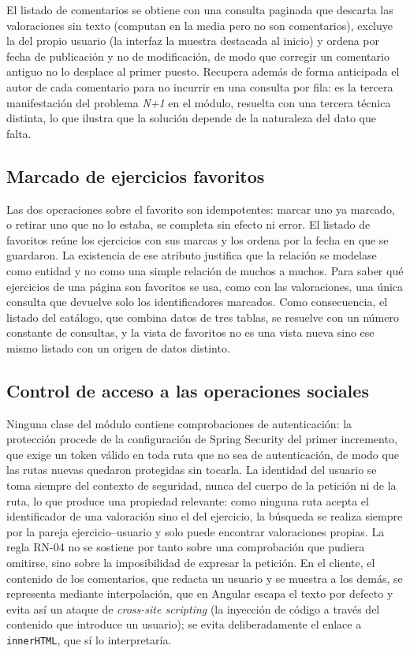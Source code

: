 \documentclass[12pt,a4paper,twoside,openright]{book}
\begin{document}
    El listado de comentarios se obtiene con una consulta paginada que descarta
    las valoraciones sin texto (computan en la media pero no son comentarios),
    excluye la del propio usuario (la interfaz la muestra destacada al inicio)
    y ordena por fecha de publicación y no de modificación, de modo que corregir
    un comentario antiguo no lo desplace al primer puesto. Recupera además de
    forma anticipada el autor de cada comentario para no incurrir en una consulta
    por fila: es la tercera manifestación del problema \textit{N+1} en el módulo,
    resuelta con una tercera técnica distinta, lo que ilustra que la solución
    depende de la naturaleza del dato que falta.

    \subsection{Marcado de ejercicios favoritos}

    Las dos operaciones sobre el favorito son idempotentes: marcar uno ya marcado,
    o retirar uno que no lo estaba, se completa sin efecto ni error. El listado de
    favoritos reúne los ejercicios con sus marcas y los ordena por la fecha 
    en que se guardaron. La existencia de ese atributo justifica que la relación
    se modelase como entidad y no como una simple relación de muchos a muchos. Para saber
    qué ejercicios de una página son favoritos se usa, como con las valoraciones,
    una única consulta que devuelve solo los identificadores marcados. Como
    consecuencia, el listado del catálogo, que combina datos de tres tablas, se
    resuelve con un número constante de consultas, y la vista de favoritos no es
    una vista nueva sino ese mismo listado con un origen de datos distinto.

    \subsection{Control de acceso a las operaciones sociales}

    Ninguna clase del módulo contiene comprobaciones de autenticación: la
    protección procede de la configuración de Spring Security del primer
    incremento, que exige un token válido en toda ruta que no sea de
    autenticación, de modo que las rutas nuevas quedaron protegidas sin tocarla.
    La identidad del usuario se toma siempre del contexto de seguridad,
    nunca del cuerpo de la petición ni de la ruta, lo que produce una propiedad relevante:
    como ninguna ruta acepta el identificador de una valoración sino el
    del ejercicio, la búsqueda se realiza siempre por la pareja ejercicio--usuario
    y solo puede encontrar valoraciones propias. La regla RN-04 no se sostiene por
    tanto sobre una comprobación que pudiera omitirse, sino sobre la imposibilidad
    de expresar la petición. En el cliente, el contenido de los comentarios,
    que redacta un usuario y se muestra a los demás, se representa mediante interpolación,
    que en Angular escapa el texto por defecto y evita así un
    ataque de \textit{cross-site scripting} (la inyección de código a través del
    contenido que introduce un usuario); se evita deliberadamente el enlace a
    \texttt{innerHTML}, que sí lo interpretaría.
\end{document}

